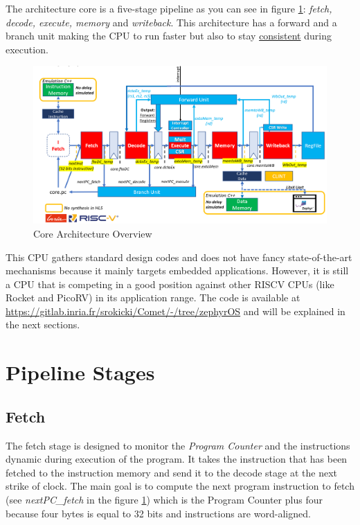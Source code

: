 \documentclass[10pt,letterpaper]{article}
\begin{document}
The architecture core is a five-stage pipeline as you can see in figure \ref{fig:macro_two}: \textit{fetch, decode, execute, memory} and \textit{writeback}. This architecture has a forward and a branch unit making the CPU to run faster but also to stay \underline{consistent} during execution. 

\vspace{0.5cm}

\begin{figure}[H]
\centering
\includegraphics[width=16cm]{img/global_macro_2.PNG}
\caption{Core Architecture Overview}
\label{fig:macro_two}
\end{figure}

This CPU gathers standard design codes and does not have fancy state-of-the-art mechanisms because it mainly targets embedded applications. However, it is still a CPU that is competing in a good position against other RISCV CPUs (like Rocket and PicoRV) in its application range. The code is available at \url{https://gitlab.inria.fr/srokicki/Comet/-/tree/zephyrOS} and will be explained in the next sections.

\section{Pipeline Stages}

\subsection{Fetch}

The fetch stage is designed to monitor the \textit{Program Counter} and the instructions dynamic during execution of the program. It takes the instruction that has been fetched to the instruction memory and send it to the decode stage at the next strike of clock. The main goal is to compute the next program instruction to fetch (see \textit{nextPC\_fetch} in the figure \ref{fig:macro_two}) which is the Program Counter plus four because four bytes is equal to 32 bits and instructions are word-aligned. 
\end{document}
